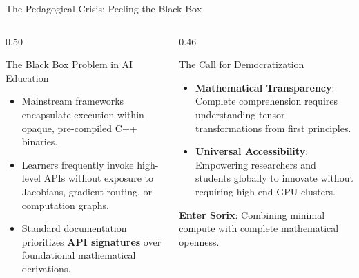 \documentclass[11pt,aspectratio=169]{beamer}
\begin{document}
\begin{frame}{The Pedagogical Crisis: Peeling the Black Box}
  \begin{columns}[T,onlytextwidth]
    \begin{column}{0.50\textwidth}
      \begin{alertblock}{The Black Box Problem in AI Education}
        \begin{itemize}
          \setlength{\itemsep}{0.25em}
          \item Mainstream frameworks encapsulate execution within opaque, pre-compiled C++ binaries.
          \item Learners frequently invoke high-level APIs without exposure to Jacobians, gradient routing, or computation graphs.
          \item Standard documentation prioritizes \textbf{API signatures} over foundational mathematical derivations.
        \end{itemize}
      \end{alertblock}
    \end{column}

    \begin{column}{0.46\textwidth}
      \begin{exampleblock}{The Call for Democratization}
        \begin{itemize}
          \setlength{\itemsep}{0.25em}
          \item \textbf{Mathematical Transparency}: Complete comprehension requires understanding tensor transformations from first principles.
          \item \textbf{Universal Accessibility}: Empowering researchers and students globally to innovate without requiring high-end GPU clusters.
        \end{itemize}
      \end{exampleblock}
      \vspace{0.4em}
      \begin{center}
        \textbf{Enter Sorix}: Combining minimal compute with complete mathematical openness.
      \end{center}
    \end{column}
  \end{columns}
\end{frame}
\end{document}
